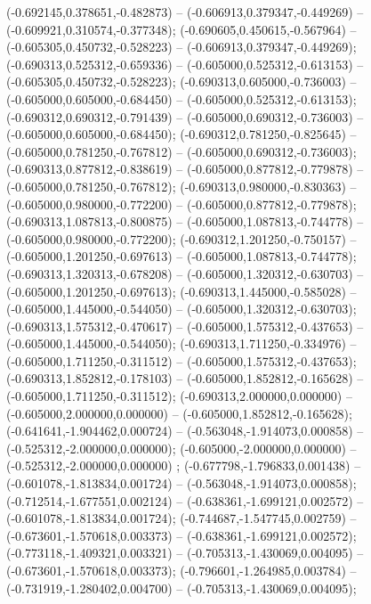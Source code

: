  (-0.692145,0.378651,-0.482873) -- (-0.606913,0.379347,-0.449269) -- (-0.609921,0.310574,-0.377348);
 (-0.690605,0.450615,-0.567964) -- (-0.605305,0.450732,-0.528223) -- (-0.606913,0.379347,-0.449269);
 (-0.690313,0.525312,-0.659336) -- (-0.605000,0.525312,-0.613153) -- (-0.605305,0.450732,-0.528223);
 (-0.690313,0.605000,-0.736003) -- (-0.605000,0.605000,-0.684450) -- (-0.605000,0.525312,-0.613153);
 (-0.690312,0.690312,-0.791439) -- (-0.605000,0.690312,-0.736003) -- (-0.605000,0.605000,-0.684450);
 (-0.690312,0.781250,-0.825645) -- (-0.605000,0.781250,-0.767812) -- (-0.605000,0.690312,-0.736003);
 (-0.690313,0.877812,-0.838619) -- (-0.605000,0.877812,-0.779878) -- (-0.605000,0.781250,-0.767812);
 (-0.690313,0.980000,-0.830363) -- (-0.605000,0.980000,-0.772200) -- (-0.605000,0.877812,-0.779878);
 (-0.690313,1.087813,-0.800875) -- (-0.605000,1.087813,-0.744778) -- (-0.605000,0.980000,-0.772200);
 (-0.690312,1.201250,-0.750157) -- (-0.605000,1.201250,-0.697613) -- (-0.605000,1.087813,-0.744778);
 (-0.690313,1.320313,-0.678208) -- (-0.605000,1.320312,-0.630703) -- (-0.605000,1.201250,-0.697613);
 (-0.690313,1.445000,-0.585028) -- (-0.605000,1.445000,-0.544050) -- (-0.605000,1.320312,-0.630703);
 (-0.690313,1.575312,-0.470617) -- (-0.605000,1.575312,-0.437653) -- (-0.605000,1.445000,-0.544050);
 (-0.690313,1.711250,-0.334976) -- (-0.605000,1.711250,-0.311512) -- (-0.605000,1.575312,-0.437653);
 (-0.690313,1.852812,-0.178103) -- (-0.605000,1.852812,-0.165628) -- (-0.605000,1.711250,-0.311512);
 (-0.690313,2.000000,0.000000) -- (-0.605000,2.000000,0.000000) -- (-0.605000,1.852812,-0.165628);
 (-0.641641,-1.904462,0.000724) -- (-0.563048,-1.914073,0.000858) -- (-0.525312,-2.000000,0.000000);
 (-0.605000,-2.000000,0.000000) -- (-0.525312,-2.000000,0.000000) ;
 (-0.677798,-1.796833,0.001438) -- (-0.601078,-1.813834,0.001724) -- (-0.563048,-1.914073,0.000858);
 (-0.712514,-1.677551,0.002124) -- (-0.638361,-1.699121,0.002572) -- (-0.601078,-1.813834,0.001724);
 (-0.744687,-1.547745,0.002759) -- (-0.673601,-1.570618,0.003373) -- (-0.638361,-1.699121,0.002572);
 (-0.773118,-1.409321,0.003321) -- (-0.705313,-1.430069,0.004095) -- (-0.673601,-1.570618,0.003373);
 (-0.796601,-1.264985,0.003784) -- (-0.731919,-1.280402,0.004700) -- (-0.705313,-1.430069,0.004095);
